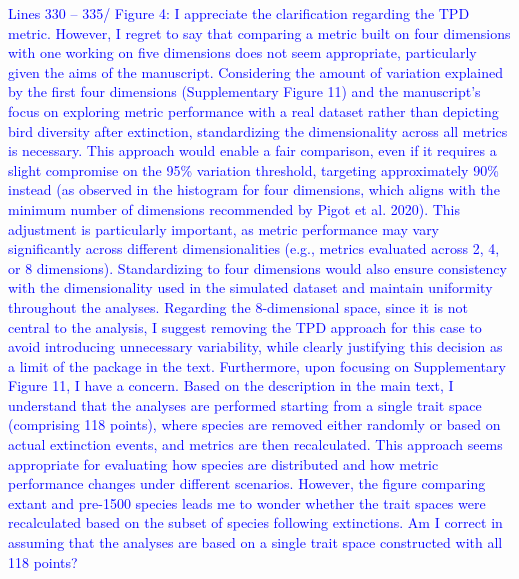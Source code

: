 \documentclass[
]{article}
\begin{document}


\textcolor{blue}{Lines 330 – 335/ Figure 4: I appreciate the clarification regarding the TPD metric.
However, I regret to say that comparing a metric built on four dimensions with one working on five dimensions does not seem appropriate, particularly given the aims of the manuscript.
Considering the amount of variation explained by the first four dimensions (Supplementary Figure 11) and the manuscript's focus on exploring metric performance with a real dataset rather than depicting bird diversity after extinction, standardizing the dimensionality across all metrics is necessary.
This approach would enable a fair comparison, even if it requires a slight compromise on the 95\% variation threshold, targeting approximately 90\% instead (as observed in the histogram for four dimensions, which aligns with the minimum number of dimensions recommended by Pigot et al. 2020).
This adjustment is particularly important, as metric performance may vary significantly across different dimensionalities (e.g., metrics evaluated across 2, 4, or 8 dimensions).
Standardizing to four dimensions would also ensure consistency with the dimensionality used in the simulated dataset and maintain uniformity throughout the analyses.
Regarding the 8-dimensional space, since it is not central to the analysis, I suggest removing the TPD approach for this case to avoid introducing unnecessary variability, while clearly justifying this decision as a limit of the package in the text.
Furthermore, upon focusing on Supplementary Figure 11, I have a concern.
Based on the description in the main text, I understand that the analyses are performed starting from a single trait space (comprising 118 points), where species are removed either randomly or based on actual extinction events, and metrics are then recalculated.
This approach seems appropriate for evaluating how species are distributed and how metric performance changes under different scenarios.
However, the figure comparing extant and pre-1500 species leads me to wonder whether the trait spaces were recalculated based on the subset of species following extinctions.
Am I correct in assuming that the analyses are based on a single trait space constructed with all 118 points?}


\end{document}
